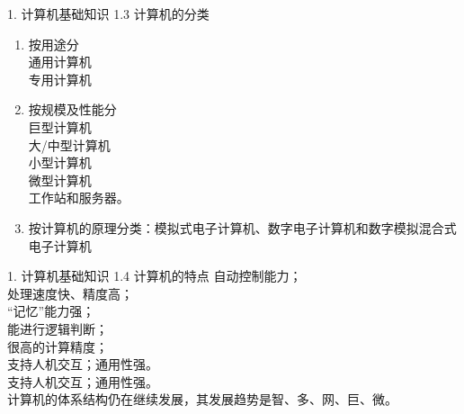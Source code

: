 \documentclass[aspectratio=169]{beamer}
\begin{document}
\begin{frame}[t]{1. 计算机基础知识} \vspace{20pt}
    1.3 计算机的分类

    \begin{enumerate}
        \item{按用途分}\\
            通用计算机\\
            专用计算机\\
        \item{按规模及性能分} \\
            巨型计算机\\
            大/中型计算机\\
            小型计算机\\
            微型计算机\\
            工作站和服务器。\\
        \item{ 按计算机的原理分类：模拟式电子计算机、数字电子计算机和数字模拟混合式电子计算机}
    \end{enumerate}

\end{frame}

\begin{frame}[t]{1. 计算机基础知识} \vspace{20pt}
    1.4 计算机的特点
            自动控制能力；\\
            处理速度快、精度高；\\
            “记忆”能力强；\\
            能进行逻辑判断；\\
            很高的计算精度；\\
            支持人机交互；通用性强。\\
            支持人机交互；通用性强。\\
            计算机的体系结构仍在继续发展，其发展趋势是智、多、网、巨、微。\\
\end{frame}
\end{document}
